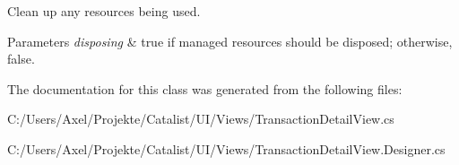 Clean up any resources being used. 


\begin{DoxyParams}{Parameters}
{\em disposing} & true if managed resources should be disposed; otherwise, false.\\
\hline
\end{DoxyParams}


The documentation for this class was generated from the following files\+:\begin{DoxyCompactItemize}
\item 
C\+:/\+Users/\+Axel/\+Projekte/\+Catalist/\+U\+I/\+Views/Transaction\+Detail\+View.\+cs\item 
C\+:/\+Users/\+Axel/\+Projekte/\+Catalist/\+U\+I/\+Views/Transaction\+Detail\+View.\+Designer.\+cs\end{DoxyCompactItemize}
